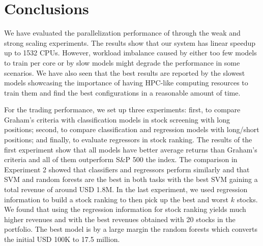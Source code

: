 \chapter{Conclusions}
\label{chap:conclusions}

We have evaluated the parallelization performance of \HPCsys through the weak and strong scaling experiments. The results show that our system has linear speedup up to 1532 CPUs. However, workload imbalance caused by either too few models to train per core or by slow models might degrade the performance in some scenarios. We have also seen that the best results are reported by the slowest models showcasing the importance of having HPC-like computing resources to train them and find the best configurations in a reasonable amount of time.

For the trading performance, we set up three experiments: first, to compare Graham's criteria with classification models in stock screening with long positions; second, to compare classification and regression models with long/short positions; and finally, to evaluate regressors in stock ranking. The results of the first experiment show that all models have better average returns than Graham's criteria and all of them outperform S\&P 500 the index. The comparison in Experiment 2 showed that classifiers and regressors perform similarly and that SVM and random forests are the best in both tasks with the best SVM gaining a total revenue of around USD 1.8M. In the last experiment, we used regression information to build a stock ranking to then pick up the best and worst $k$ stocks. We found that using the regression information for stock ranking yields much higher revenues and with the best revenues obtained with 20 stocks in the portfolio. The best model is by a large margin the random forests which converts the initial USD 100K to 17.5 million.